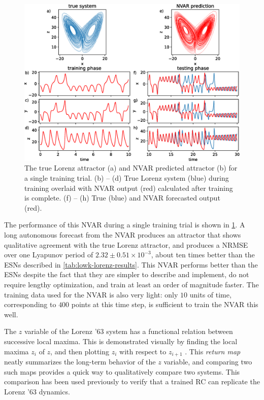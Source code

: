 \begin{figure}
  \includegraphics[width=\textwidth]{figures/nvar-predict-lorenz}
  \caption{The true Lorenz attractor (a) and NVAR predicted attractor (b) for a single training trial. (b) -- (d) True Lorenz system (blue) during training overlaid with NVAR output (red) calculated after training is complete. (f) -- (h) True (blue) and NVAR forecasted output (red).}
  \label{fig:nvar-predict-lorenz}
\end{figure}

The performance of this NVAR during a single training trial is shown
in \cref{fig:nvar-predict-lorenz}. A long autonomous forecast from the
NVAR produces an attractor that shows qualitative agreement with the
true Lorenz attractor, and produces a NRMSE over one Lyapunov period
of $2.32\pm0.51\times10^{-3}$, about ten times better than the ESNs
described in \cref{tab:lowk-lorenz-results}. This NVAR performs better
than the ESNs despite the fact that they are simpler to describe and
implement, do not require lengthy optimization, and train at least an
order of magnitude faster. The training data used for the NVAR is also
very light: only $10$ units of time, corresponding to $400$ points at
this time step, is sufficient to train the NVAR this well.

The $z$ variable of the Lorenz '63 system has a functional relation
between successive local maxima. This is demonstrated visually by
finding the local maxima $z_i$ of $z$, and then plotting $z_i$ with
respect to $z_{i+1}$ \cite{lorenz1963}. This \emph{return map} neatly
summarizes the long-term behavior of the $z$ variable, and comparing
two such maps provides a quick way to qualitatively compare two
systems. This comparison has been used previously to verify that a
trained RC can replicate the Lorenz '63 dynamics. \cite{pathak2017}

